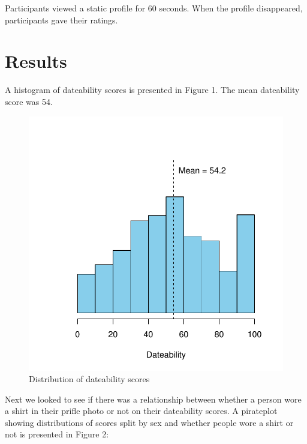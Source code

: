 \documentclass[english,floatsintext,man]{apa6}
\theoremstyle{definition}
\theoremstyle{definition}
\theoremstyle{remark}
\begin{document}
Participants viewed a static profile for 60 seconds. When the profile
disappeared, participants gave their ratings.

\section{Results}\label{results}

A histogram of dateability scores is presented in Figure 1. The mean
dateability score was 54.

\begin{figure}[htbp]
\centering
\includegraphics{02-papaja-example-article-nathaniel-phillips_files/figure-latex/unnamed-chunk-3-1.pdf}
\caption{\label{fig:unnamed-chunk-3}Distribution of dateability scores}
\end{figure}

Next we looked to see if there was a relationship between whether a
person wore a shirt in their prifle photo or not on their dateability
scores. A pirateplot showing distributions of scores split by sex and
whether people wore a shirt or not is presented in Figure 2:
\end{document}
